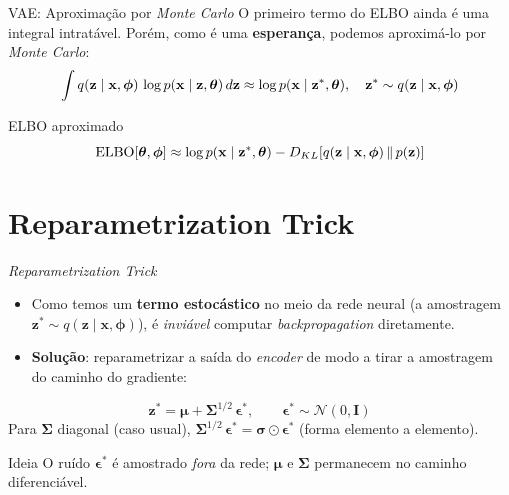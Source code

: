 \documentclass[aspectratio=169,xcolor=dvipsnames]{beamer}
\begin{document}
  \begin{frame}{VAE: Aproximação por \textit{Monte Carlo}}
    O primeiro termo do ELBO ainda é uma integral intratável. Porém,
    como é uma \textbf{esperança}, podemos aproximá-lo por
    \textit{Monte Carlo}:
    \vspace{0.3em}
    \[
      \int q(\mathbf{z} \mid \mathbf{x}, \bm{\phi})\,\log p(\mathbf{x} \mid \mathbf{z}, \bm{\theta})\, d\mathbf{z}
      \approx \log p(\mathbf{x} \mid \mathbf{z}^{*}, \bm{\theta}),
      \quad \mathbf{z}^{*} \sim q(\mathbf{z} \mid \mathbf{x}, \bm{\phi})
    \]
    \vspace{0.3em}
    \begin{block}{ELBO aproximado}
      \[
        \mathrm{ELBO}[\bm{\theta}, \bm{\phi}] \approx
        \log p(\mathbf{x} \mid \mathbf{z}^{*}, \bm{\theta})
        - D_{KL}\!\left[q(\mathbf{z} \mid \mathbf{x}, \bm{\phi})\,\|\,p(\mathbf{z})\right]
      \]
    \end{block}
  \end{frame}

  \section{Reparametrization Trick}

  \begin{frame}{\textit{Reparametrization Trick}}
    \begin{itemize}
      \item Como temos um \textbf{termo estocástico} no meio da rede
      neural (a amostragem $\mathbf{z}^{*} \sim q(\mathbf{z} \mid \mathbf{x}, \bm{\phi})$), é
      \emph{inviável} computar \textit{backpropagation} diretamente.
      \item \textbf{Solução}: reparametrizar a saída do \textit{encoder}
      de modo a tirar a amostragem do caminho do gradiente:
    \end{itemize}
    \vspace{0.3em}
    \[
      \mathbf{z}^{*} = \boldsymbol{\mu} + \boldsymbol{\Sigma}^{1/2}\,\boldsymbol{\epsilon}^{*},
      \qquad \boldsymbol{\epsilon}^{*} \sim \mathcal{N}(0, \mathbf{I})
    \]
    \vspace{0.2em}
    Para $\boldsymbol{\Sigma}$ diagonal (caso usual), $\boldsymbol{\Sigma}^{1/2}\,\boldsymbol{\epsilon}^{*} = \boldsymbol{\sigma} \odot \boldsymbol{\epsilon}^{*}$ (forma elemento a elemento).
    \begin{block}{Ideia}
      O ruído $\boldsymbol{\epsilon}^{*}$ é amostrado \emph{fora} da rede; $\boldsymbol{\mu}$ e
      $\boldsymbol{\Sigma}$ permanecem no caminho diferenciável.
    \end{block}
  \end{frame}
\end{document}
